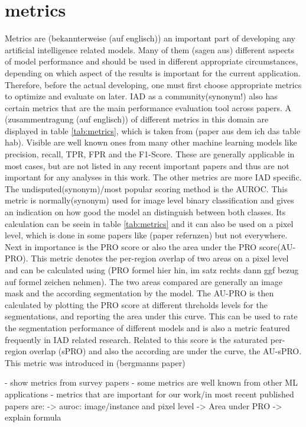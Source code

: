 \section{metrics}
Metrics are (bekannterweise (auf englisch)) an important part of developing any artificial intelligence related models. Many of them 
(sagen aus) different aspects of model performance and should be used in different appropriate circumstances, depending on which aspect 
of the results is important for the current application. Therefore, before the actual developing, one must first choose appropriate metrics 
to optimize and evaluate on later. IAD as a community(synonym!) also has certain metrics that are the main performance evaluation tool 
across papers. 
A (zusammentragung (auf englisch)) of different metrics in this domain are displayed in table \ref{tab:metrics}, which is taken from 
(paper aus dem ich das table hab). Visible are well known 
ones from many other machine learning models like precision, recall, TPR, FPR and the F1-Score. These are generally applicable in most 
cases, but are not listed in any recent important papers and thus are not important for any analyses in this work. The other metrics are 
more IAD specific. The undisputed(synonym)/most popular scoring method is the AUROC. This metric is normally(synonym) used for image level 
binary classification and gives an indication on how good the model an distinguish between both classes. Its calculation can be seein in 
table \ref{tab:metrics} and it can also be used on a pixel level, which is done in some papers like (paper refernzen) but not everywhere.
Next in importance is the PRO score or also the area under the PRO score(AU-PRO). This metric denotes the per-region overlap of two areas 
on a pixel level and can be calculated using (PRO formel hier hin, im satz rechts dann ggf bezug auf formel zeichen nehmen). The two areas 
compared are generally an image mask and the according segmentation by the model. The AU-PRO is then calculated by plotting the PRO score 
at different threholds levels for the segmentations, and reporting the area under this curve. This can be 
used to rate the segmentation performance of different models and is also a metric featured frequently in IAD related research. 
Related to this score is the saturated per-region overlap (sPRO) and also the according are under the curve, the AU-sPRO. This metric was 
introduced in (bergmanns paper) \cite{LOCODentsAndScratchesBergmann2022}


- show metrics from survey papers
- some metrics are well known from other ML applications
- metrics that are important for our work/in most recent published papers are:
-> auroc: image/instance and pixel level
-> Area under PRO
-> explain formula

